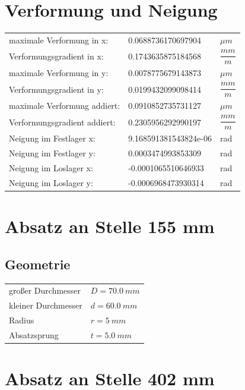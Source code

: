 \documentclass[11pt,a4paper]{article}
\begin{document}
\section{Verformung und Neigung}

\begin{center}
\begin{tabular}{|lll|}
maximale Verformung in x: & 0.0688736170697904& $\mu m$ \\
Verformungsgradient in x: & 0.1743635875184568& $\dfrac{mm}{m}$ \\
maximale Verformung in y: & 0.0078775679143873& $\mu m$ \\
Verformungsgradient in y: &0.0199432099098414& $\dfrac{mm}{m}$ \\
maximale Verformung addiert: & 0.0910852735731127& $\mu m$ \\
Verformungsgradient addiert: &0.2305956292990197& $\dfrac{mm}{m}$ \\
\hline 
Neigung im Festlager x: &9.168591381543824e-06& rad \\
Neigung im Festlager y: &0.0003474993853309& rad \\
Neigung im Loslager x: &-0.0001065510646933& rad \\
Neigung im Loslager y: &-0.0006968473930314& rad \\
\end{tabular}
\end{center}


\section*{Absatz an Stelle 155 mm}

\subsection*{Geometrie}

\begin{center}
\begin{tabular}{|ll|}
großer Durchmesser & $D =70.0\ mm$ \\
kleiner Durchmesser & $d =60.0\ mm$ \\
Radius & $r =5\ mm$ \\
Absatzsprung & $t =5.0\ mm$
\end{tabular}
\end{center}

\section*{Absatz an Stelle 402 mm}
\end{document}
